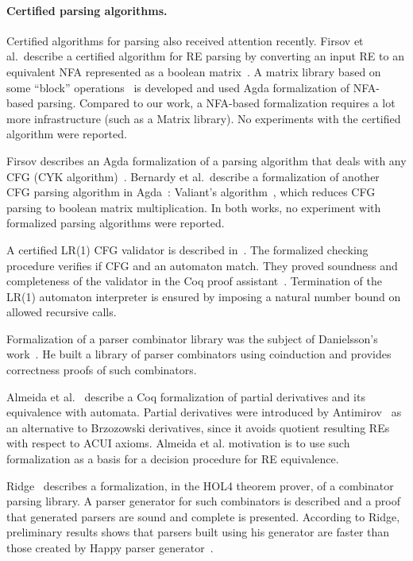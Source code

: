 \documentclass[sigplan, anonymous, review]{acmart}
\theoremstyle{definition}
\begin{document}
\paragraph{Certified parsing algorithms.} Certified algorithms for
parsing also received attention recently. Firsov et al.~describe a
certified algorithm for RE parsing by converting an input RE to an
equivalent NFA represented as a boolean matrix~\cite{FirsovU13}. A
matrix library based on some ``block'' operations~\cite{MacedoO13} is
developed and used Agda formalization of NFA-based parsing. Compared 
to our work, a NFA-based formalization requires
a lot more infrastructure (such as a Matrix library). No experiments
with the certified algorithm were reported.

Firsov describes an Agda formalization of a parsing algorithm that
deals with any CFG (CYK algorithm)~\cite{Firsov2014}. Bernardy
et al.~describe a formalization of another CFG parsing algorithm in
Agda~\cite{BernardyJ16}: Valiant's algorithm~\cite{Valiant1975}, which
reduces CFG parsing to boolean matrix multiplication. In both works,
no experiment with formalized parsing algorithms were reported.

A certified LR(1) CFG validator is described
in~\cite{Jourdan2012}. The formalized checking procedure verifies if
CFG and an automaton match. They proved soundness and completeness of
the validator in the Coq proof
assistant~\cite{Bertot2010}. Termination of the LR(1) automaton
interpreter is ensured by imposing a natural number bound on
allowed recursive calls.

Formalization of a parser combinator library was the subject of
Danielsson's work~\cite{Danielsson2010}. He built a library of parser
combinators using coinduction and provides correctness proofs of such
combinators.

Almeida et al.~\cite{AlmeidaMPS10} describe a Coq formalization of
partial derivatives and its equivalence with automata. Partial
derivatives were introduced by Antimirov~\cite{Antimirov91} as an
alternative to Brzozowski derivatives, since it avoids quotient
resulting REs with respect to ACUI axioms. Almeida et al. motivation
is to use such formalization as a basis for a decision procedure for
RE equivalence.

Ridge~\cite{Ridge2011} describes a formalization, in the HOL4 theorem
prover, of a combinator parsing library. A parser generator for such
combinators is described and a proof that generated parsers are sound
and complete is presented.  According to Ridge, preliminary results
shows that parsers built using his generator are faster than those
created by Happy parser generator~\cite{Happy}.
\end{document}

